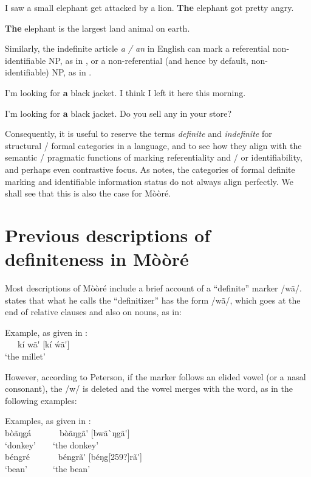 \documentclass[output=paper]{langsci/langscibook}
\begin{document}
\ea\label{ex:teo:6}
\label{bkm:Ref264213626}I saw a small elephant get attacked by a lion. \textbf{The} elephant got pretty angry.
\z

\ea\label{ex:teo:7}
\label{bkm:Ref264213634}\textbf{The} elephant is the largest land animal on earth.
\z

Similarly, the indefinite article \textit{a / an} in English can mark a referential non-identifiable NP, as in , or a non-referential (and hence by default, non-identifiable) NP, as in .

\ea\label{ex:teo:8}
\label{bkm:Ref264213641}I’m looking for \textbf{a} black jacket. I think I left it here this morning. 
\z

\ea\label{ex:teo:9}
I’m looking for \textbf{a} black jacket. Do you sell any in your store? 
\z

Consequently, it is useful to reserve the terms \textit{definite} and \textit{indefinite} for structural / formal categories in a language, and to see how they align with the semantic / pragmatic functions of marking referentiality and / or identifiability, and perhaps even contrastive focus. As \citet[79]{Lambrecht1994} notes, the categories of formal definite marking and identifiable information status do not always align perfectly. We shall see that this is also the case for M\`{o}\`{o}ré.

\section{Previous descriptions of definiteness in Mòòré}\label{sec:teo:3}

Most descriptions of Mòòré include a brief account of a “definite” marker /wã/. \citet[77]{Peterson1971} states that what he calls the “definitizer” has the form /wã/, which goes at the end of relative clauses and also on nouns, as in:

\ea\label{ex:teo:10}
Example, as given in \citealt[77]{Peterson1971}:\\
\ \ \ k\'{i} w\~{a}\'{ } [k\'{i} \'{w}\~{a}\'{ }]\\
‘the millet’
\z

However, according to Peterson, if the marker follows an elided vowel (or a nasal consonant), the /w/ is deleted and the vowel merges with the word, as in the following examples:

\ea\label{ex:teo:11}
Examples, as given in \citealt[77]{Peterson1971}:\\
b\`{o}\~{a}ŋg\'{a} \ \ \ \ \ \ b\`{o}\~{a}ŋg\~{a}\'{ } [bw\~{a}\`{ }ŋg\~{a}\'{ }] \\
‘donkey’\ \ \ \ ‘the donkey’\\
béngré \ \ \ \ \ \ béngr\~{a}\'{ } [béŋg[259?]r\~{a}\'{ }] \\
‘bean’\ \ \ \ \ \ ‘the bean’
\z
\end{document}
